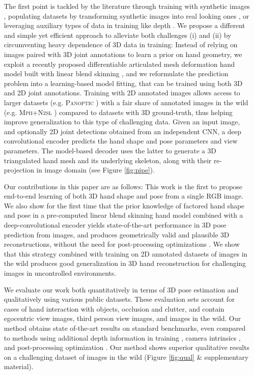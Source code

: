 \documentclass[10pt,twocolumn,letterpaper]{article}
\begin{document}
The first point is tackled by the literature through training with synthetic images \cite{zimmermann2017learning}, populating datasets by transforming synthetic images into real looking ones \cite{GANeratedHands_CVPR2018}, or leveraging auxiliary types of data in training like depth \cite{cai2018weakly,spurr2018cross}. We propose a different and simple yet efficient approach to alleviate both challenges (i) and (ii) by circumventing heavy dependence of 3D data in training: Instead of relying on images paired with 3D joint annotations to learn a prior on hand geometry, we exploit a recently proposed differentiable articulated mesh deformation hand model \cite{romero2017embodied} built with linear blend skinning \cite{Kavan:2005:SBS:1053427.1053429}, and we reformulate the prediction problem into a learning-based model fitting, that can be trained using both 3D and 2D joint annotations. Training with 2D annotated images allows access to larger datasets (e.g. \textsc{Panoptic} \cite{simon2017hand}) with a fair share of annotated images in the wild (e.g. \textsc{Mpii+Nzsl} \cite{simon2017hand}) compared to datasets with 3D ground-truth, thus helping improve generalization to this type of challenging data. Given an input image, and optionally 2D joint detections obtained from an independent CNN, a deep convolutional encoder predicts the hand shape and pose parameters and view parameters. The model-based decoder uses the latter to generate a 3D triangulated hand mesh and its underlying skeleton, along with their re-projection in image domain (see Figure \ref{fig:pipe}). 

Our contributions in this paper are as follows: This work is the first to propose end-to-end learning of both 3D hand shape and pose from a single RGB image. We also show for the first time that the prior knowledge of factored hand shape and pose in a pre-computed linear blend skinning \cite{Kavan:2005:SBS:1053427.1053429} hand model \cite{romero2017embodied} combined with a deep-convolutional encoder yields state-of-the-art performance in 3D pose prediction from images, and produces geometrically valid and plausible 3D reconstructions, without the need for post-processing optimizations \cite{GANeratedHands_CVPR2018}. We show that this strategy combined with training on 2D annotated datasets of images in the wild produces good generalization in 3D hand reconstruction for challenging images in uncontrolled environments.   

We evaluate our work both quantitatively in terms of 3D pose estimation and qualitatively using various public datasets. These evaluation sets account for cases of hand interaction with objects, occlusion and clutter, and contain egocentric view images, third person view images, and images in the wild. Our method obtains state of-the-art results on standard benchmarks, even compared to methods using additional depth information in training \cite{cai2018weakly,spurr2018cross}, camera intrinsics \cite{GANeratedHands_CVPR2018,panteleris2018using}, and post-processing optimization \cite{GANeratedHands_CVPR2018}. Our method shows superior qualitative results on a challenging dataset of images in the wild (Figure \ref{fig:qual} \& supplementary material).
\end{document}
